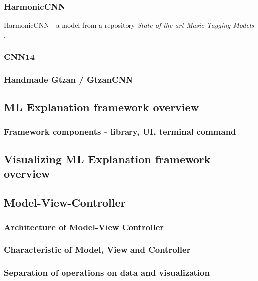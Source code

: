 \documentclass[
    bindingoffset=5mm,  %
    footnoteindent=3mm, %
    hyphenation=true    %
]{src/wut-thesis}
\begin{document}
\subsubsection{HarmonicCNN}
HarmonicCNN - a model from a repository \textit{State-of-the-art Music Tagging Models} \cite{Won2020-ej}.
\subsubsection{CNN14}
\subsubsection{Handmade Gtzan / GtzanCNN}

\subsection{ML Explanation framework overview} \label{ch2:ArchitectureOverview}
\subsubsection{Framework components - library, UI, terminal command}

\subsection{Visualizing ML Explanation framework overview} 

\subsection{Model-View-Controller} \label{ch1:ModelViewController}
\subsubsection{Architecture of Model-View Controller}
\subsubsection{Characteristic of Model, View and Controller}
\subsubsection{Separation of operations on data and visualization}

%
%
\clearpage %
\end{document}
